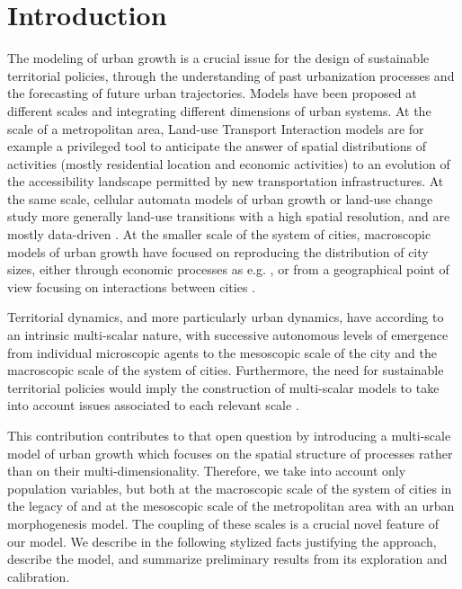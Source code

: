 \documentclass[a4paper,twocolumn,twoside,10pt]{article}
\theoremstyle{definition}
\begin{document}
\section{Introduction}

The modeling of urban growth is a crucial issue for the design of sustainable territorial policies, through the understanding of past urbanization processes and the forecasting of future urban trajectories. Models have been proposed at different scales and integrating different dimensions of urban systems. At the scale of a metropolitan area, Land-use Transport Interaction models \cite{wegener2004land} are for example a privileged tool to anticipate the answer of spatial distributions of activities (mostly residential location and economic activities) to an evolution of the accessibility landscape permitted by new transportation infrastructures. At the same scale, cellular automata models of urban growth or land-use change study more generally land-use transitions with a high spatial resolution, and are mostly data-driven \cite{clarke2007decade}. At the smaller scale of the system of cities, macroscopic models of urban growth have focused on reproducing the distribution of city sizes, either through economic processes as e.g. \cite{gabaix1999zipf}, or from a geographical point of view focusing on interactions between cities \cite{favaro2011gibrat}.


Territorial dynamics, and more particularly urban dynamics, have according to \cite{pumain1997pour} an intrinsic multi-scalar nature, with successive autonomous levels of emergence from individual microscopic agents to the mesoscopic scale of the city and the macroscopic scale of the system of cities. Furthermore, the need for sustainable territorial policies would imply the construction of multi-scalar models to take into account issues associated to each relevant scale \cite{Rozenblat2018}.

This contribution contributes to that open question by introducing a multi-scale model of urban growth which focuses on the spatial structure of processes rather than on their multi-dimensionality. Therefore, we take into account only population variables, but both at the macroscopic scale of the system of cities in the legacy of \cite{pumain2017urban} and at the mesoscopic scale of the metropolitan area with an urban morphogenesis model. The coupling of these scales is a crucial novel feature of our model. We describe in the following stylized facts justifying the approach, describe the model, and summarize preliminary results from its exploration and calibration.
\end{document}
